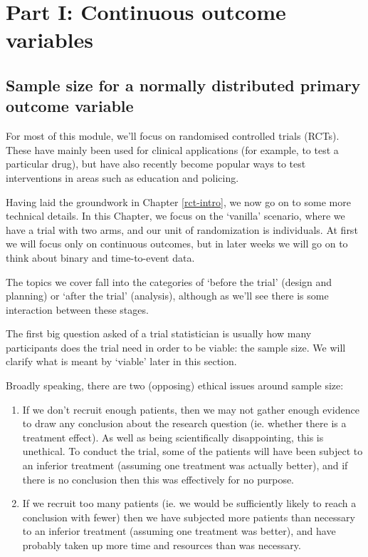 \documentclass[
  openany]{book}
\providecommand{\tightlist}{%
  \setlength{\itemsep}{0pt}\setlength{\parskip}{0pt}}
\theoremstyle{definition}
\theoremstyle{definition}
\theoremstyle{definition}
\theoremstyle{definition}
\theoremstyle{remark}
\begin{document}
\part{Part I: Continuous outcome variables}\label{part-part-i-continuous-outcome-variables}

\chapter{Sample size for a normally distributed primary outcome variable}\label{rct-plan}

For most of this module, we'll focus on randomised controlled trials (RCTs). These have mainly been used for clinical applications (for example, to test a particular drug), but have also recently become popular ways to test interventions in areas such as education and policing.

Having laid the groundwork in Chapter \ref{rct-intro}, we now go on to some more technical details. In this Chapter, we focus on the `vanilla' scenario, where we have a trial with two arms, and our unit of randomization is individuals. At first we will focus only on continuous outcomes, but in later weeks we will go on to think about binary and time-to-event data.

The topics we cover fall into the categories of `before the trial' (design and planning) or `after the trial' (analysis), although as we'll see there is some interaction between these stages.

The first big question asked of a trial statistician is usually how many participants does the trial need in order to be viable: the sample size. We will clarify what is meant by `viable' later in this section.

Broadly speaking, there are two (opposing) ethical issues around sample size:

\begin{enumerate}
\def\labelenumi{\arabic{enumi}.}
\tightlist
\item
  If we don't recruit enough patients, then we may not gather enough evidence to draw any conclusion about the research question (ie. whether there is a treatment effect). As well as being scientifically disappointing, this is unethical. To conduct the trial, some of the patients will have been subject to an inferior treatment (assuming one treatment was actually better), and if there is no conclusion then this was effectively for no purpose.
\item
  If we recruit too many patients (ie. we would be sufficiently likely to reach a conclusion with fewer) then we have subjected more patients than necessary to an inferior treatment (assuming one treatment was better), and have probably taken up more time and resources than was necessary.
\end{enumerate}
\end{document}
